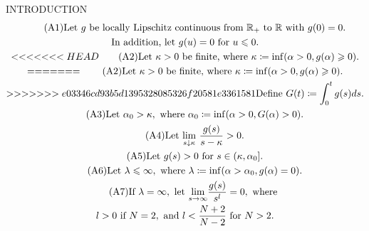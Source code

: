 {\color{red}INTRODUCTION}
\begin{gather}\tag{A1}\label{a1}\text{Let }g\text{ be locally Lipschitz continuous from }\mathbb{R}_+\text{ to }\mathbb{R}\text{ with }g(0)=0.\\
\notag\text{In addition, let }g(u)=0\text{ for }u\leq0.\\
%
<<<<<<< HEAD
\tag{A2}\label{a2}\text{Let }\kappa>0\text{ be finite, where }\kappa\coloneqq\inf(\alpha>0,g(\alpha)\geq0).\\
=======
\tag{A2}\label{a2}\text{Let }\kappa>0\text{ be finite, where }\kappa\coloneqq\inf(\alpha>0,g(\alpha)\geq0).\\ 
>>>>>>> e03346cd93b5d1395328085326f20581e3361581
%
\notag\text{Define }G(t)\coloneqq\int_0^t g(s)ds.\\
%
\tag{A3}\label{a3}\text{Let }\alpha_0>\kappa,\text{ where }\alpha_0\coloneqq\inf(\alpha>0,G(\alpha)>0).\\
%
\tag{A4}\label{a4}\text{Let }\underset{s\downarrow\kappa}{\lim}~\frac{g(s)}{s-\kappa}>0.\\
%
\tag{A5}\label{a5}\text{Let }g(s)>0\text{ for }s\in(\kappa,\alpha_0].\\
%
\tag{A6}\label{a6}\text{Let }\lambda\leq\infty,\text{ where }\lambda\coloneqq\inf(\alpha>\alpha_0,g(\alpha)=0).\\
%
\tag{A7}\label{a7}\text{If }\lambda=\infty,\text{ let }\underset{s\to\infty}{\lim}\frac{g(s)}{s^l}=0,\text{ where }\\ \notag l>0\text{ if }N=2,\text{ and }l<\frac{N+2}{N-2}\text{ for }N>2.
\end{gather}
